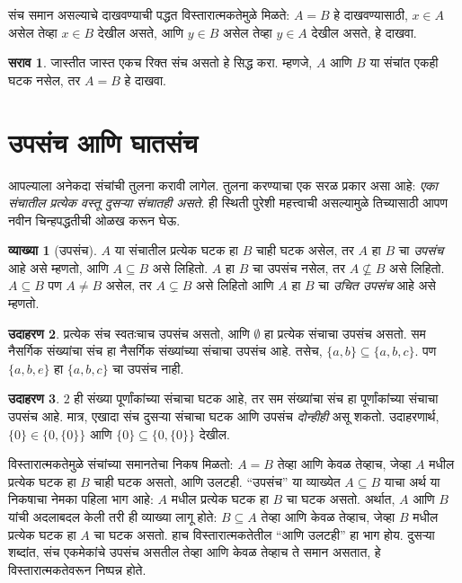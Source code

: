 \documentclass[11pt,a4paper,openany]{book}
\theoremstyle{definition}
\newtheorem{defn}{व्याख्या}[section]
\newtheorem{ex}[defn]{उदाहरण}
\newtheorem{prob}{सराव}[chapter]
\newenvironment{explain}{}{}
\begin{document}
संच समान असल्याचे दाखवण्याची पद्धत विस्तारात्मकतेमुळे मिळते:
$A = B$ हे दाखवण्यासाठी, $x \in A$ असेल तेव्हा $x \in B$ देखील असते,
आणि $y \in B$ असेल तेव्हा $y \in A$ देखील असते, हे दाखवा.

\begin{prob}
जास्तीत जास्त एकच रिक्त संच असतो हे सिद्ध करा. म्हणजे, $A$ आणि $B$ या
संचांत एकही घटक नसेल, तर $A = B$ हे दाखवा.
\end{prob}











\section{उपसंच आणि घातसंच}\label{sfr:set:sub:sec}

\begin{explain}
आपल्याला अनेकदा संचांची तुलना करावी लागेल. तुलना करण्याचा एक सरळ प्रकार
असा आहे: \emph{एका संचातील प्रत्येक वस्तू दुसऱ्या संचातही असते}.
ही स्थिती पुरेशी महत्त्वाची असल्यामुळे तिच्यासाठी आपण नवीन चिन्हपद्धतीची
ओळख करून घेऊ.
\end{explain}

\begin{defn}[उपसंच]
$A$ या संचातील प्रत्येक घटक हा $B$ चाही घटक असेल,
तर $A$ हा $B$ चा \emph{उपसंच} आहे असे म्हणतो, आणि $A \subseteq B$ असे लिहितो.
$A$ हा $B$ चा उपसंच नसेल, तर $A \not\subseteq B$ असे लिहितो.
$A \subseteq B$ पण $A \neq B$ असेल, तर $A \subsetneq B$ असे लिहितो
आणि $A$ हा $B$ चा \emph{उचित उपसंच} आहे असे म्हणतो.
\end{defn}

\begin{ex}
प्रत्येक संच स्वतःचाच उपसंच असतो, आणि $\emptyset$ हा प्रत्येक संचाचा उपसंच असतो.
सम नैसर्गिक संख्यांचा संच हा नैसर्गिक संख्यांच्या संचाचा उपसंच आहे.
तसेच, $\{ a, b \} \subseteq \{ a, b, c \}$.
पण $\{ a, b, e
\}$ हा $\{ a, b, c \}$ चा उपसंच नाही.
\end{ex}

\begin{ex}
$2$ ही संख्या पूर्णांकांच्या संचाचा घटक आहे, तर सम संख्यांचा संच
हा पूर्णांकांच्या संचाचा उपसंच आहे. मात्र, एखादा संच दुसऱ्या संचाचा
घटक आणि उपसंच \emph{दोन्हीही} असू शकतो. उदाहरणार्थ,
$\{0\} \in \{0, \{0\}\}$ आणि $\{0\} \subseteq \{0,
\{0\}\}$ देखील.
\end{ex}

विस्तारात्मकतेमुळे संचांच्या समानतेचा निकष मिळतो: $A = B$ तेव्हा आणि केवळ तेव्हाच,
जेव्हा $A$ मधील प्रत्येक घटक हा $B$ चाही घटक असतो, आणि उलटही.
``उपसंच'' या व्याख्येत $A \subseteq B$ याचा अर्थ या निकषाचा नेमका पहिला
भाग आहे: $A$ मधील प्रत्येक घटक हा $B$ चा घटक असतो.
अर्थात, $A$ आणि $B$ यांची अदलाबदल केली तरी ही व्याख्या लागू होते:
$B \subseteq A$ तेव्हा आणि केवळ तेव्हाच, जेव्हा $B$ मधील प्रत्येक घटक
हा $A$ चा घटक असतो. हाच विस्तारात्मकतेतील ``आणि उलटही'' हा भाग होय.
दुसऱ्या शब्दांत, संच एकमेकांचे उपसंच असतील तेव्हा आणि केवळ तेव्हाच ते समान
असतात, हे विस्तारात्मकतेवरून निष्पन्न होते.
\end{document}
